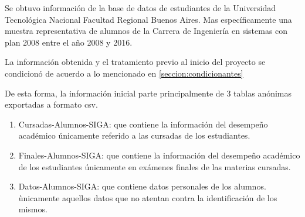 

Se obtuvo información de la base  de datos de estudiantes de la Universidad Tecnológica Nacional Facultad Regional Buenos Aires. Mas específicamente una muestra representativa de alumnos de la Carrera de Ingeniería en sistemas con plan 2008 entre el año 2008 y 2016.

La información obtenida y el tratamiento previo al inicio del proyecto se condicionó de acuerdo a lo mencionado en \ref{seccion:condicionantes}

\label{datos:raw}
De esta forma, la información inicial parte principalmente de 3 tablas anónimas exportadas a formato csv.

\begin{enumerate}
\item Cursadas-Alumnos-SIGA: que contiene la información del desempeño académico únicamente referido a las cursadas de los estudiantes.
\item Finales-Alumnos-SIGA: que contiene la información del desempeño académico de los estudiantes únicamente en exámenes finales de las materias cursadas.
\item Datos-Alumnos-SIGA: que contiene datos personales de los alumnos. ùnicamente aquellos datos que no atentan contra la identificación de los mismos.
\end{enumerate}



